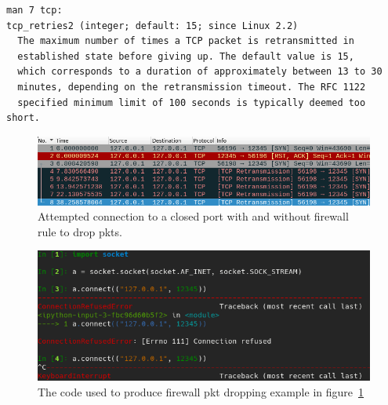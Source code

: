 \documentclass[titlepage]{article}
\begin{document}
\begin{verbatim}
man 7 tcp:
tcp_retries2 (integer; default: 15; since Linux 2.2)
  The maximum number of times a TCP packet is retransmitted in
  established state before giving up. The default value is 15,
  which corresponds to a duration of approximately between 13 to 30
  minutes, depending on the retransmission timeout. The RFC 1122
  specified minimum limit of 100 seconds is typically deemed too short.
\end{verbatim}

\begin{figure}[H]
  \centering
  \includegraphics[width=\textwidth]{packet_drop.png}
  \caption{%
    Attempted connection to a closed port with and without firewall rule to drop \glspl{pkt}.
  }\label{firewall}
\end{figure}

\begin{figure}[H]
  \centering
  \includegraphics[width=\textwidth]{packet_drop_code.png}
  \caption{%
    The code used to produce firewall \gls{pkt} dropping example in figure~\ref{firewall}
  }\label{firewall_code}
\end{figure}
\end{document}
